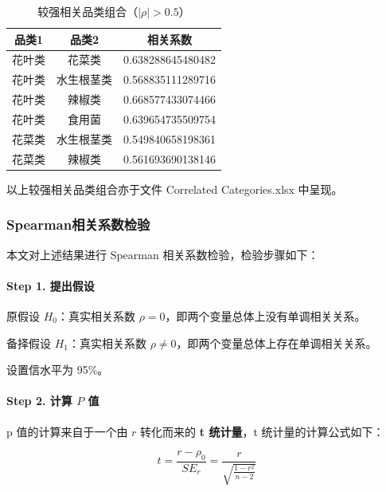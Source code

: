 \documentclass{article}
\begin{document}
	\begin{table}[htbp]
		\centering
		\caption{较强相关品类组合（\(|\rho|>0.5\)）}
		\label{tab:spearman_strong_corr}
		\renewcommand{\arraystretch}{1.5}
		\renewcommand{\heavyrulewidth}{1.2pt}
		\begin{tabular}{ccc}
			\toprule
			品类1 & 品类2 & 相关系数 \\
			\midrule
			花叶类 & 花菜类 & 0.638288645480482 \\
			花叶类 & 水生根茎类 & 0.568835111289716 \\
			花叶类 & 辣椒类 & 0.668577433074466 \\
			花叶类 & 食用菌 & 0.639654735509754 \\
			花菜类 & 水生根茎类 & 0.549840658198361 \\
			花菜类 & 辣椒类 & 0.561693690138146 \\
			\bottomrule
		\end{tabular}
		\renewcommand{\heavyrulewidth}{0.8pt}
	\end{table}
	
	以上较强相关品类组合亦于文件 Correlated Categories.xlsx 中呈现。
	
	\subsubsection{Spearman相关系数检验}
	
	本文对上述结果进行 Spearman 相关系数检验，检验步骤如下：
	
	\paragraph{Step 1. 提出假设}
	
	原假设 \(H_0\)：真实相关系数 \(\rho = 0\)，即两个变量总体上没有单调相关关系。
	
	备择假设 \(H_1\)：真实相关系数 \(\rho \neq 0\)，即两个变量总体上存在单调相关关系。
	
	设置信水平为 95\%。
	
	\paragraph{Step 2. 计算 \(P\) 值}
	
	p 值的计算来自于一个由 \(r\) 转化而来的 \textbf{t 统计量}，t 统计量的计算公式如下：
	
	\begin{equation}
		t = \frac{r - \rho_0}{SE_r} = \frac{r}{\sqrt{\frac{1-r^2}{n-2}}}
		\label{eq:t_test_correlation}
	\end{equation}
	
\end{document}
